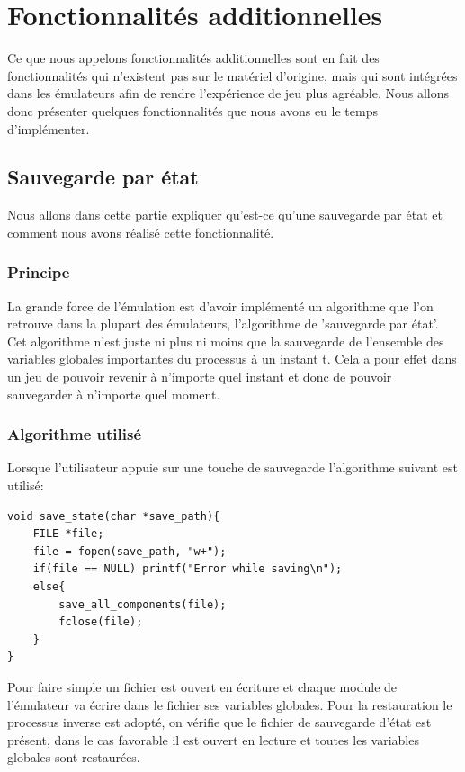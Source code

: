 \documentclass[french]{report}
\begin{document}
\section{Fonctionnalités additionnelles}
Ce que nous appelons fonctionnalités additionnelles sont en fait des fonctionnalités qui n'existent pas sur le matériel d'origine, mais qui sont intégrées dans les émulateurs afin de rendre l'expérience de jeu plus agréable. Nous allons donc présenter quelques fonctionnalités que nous avons eu le temps d'implémenter.
\subsection{Sauvegarde par état}
Nous allons dans cette partie expliquer qu'est-ce qu'une sauvegarde par état et comment nous avons réalisé cette fonctionnalité.
\subsubsection{Principe}
La grande force de l'émulation est d'avoir implémenté un algorithme que l'on retrouve dans la plupart des émulateurs, l'algorithme de 'sauvegarde par état'. Cet algorithme n'est juste ni plus ni moins que la sauvegarde de l'ensemble des variables globales importantes du processus à un instant t. Cela a pour effet dans un jeu de pouvoir revenir à n'importe quel instant et donc de pouvoir sauvegarder à n'importe quel moment.
\subsubsection{Algorithme utilisé}
Lorsque l'utilisateur appuie sur une touche de sauvegarde l'algorithme suivant est utilisé:
\begin{lstlisting}
void save_state(char *save_path){
	FILE *file;
	file = fopen(save_path, "w+");
	if(file == NULL) printf("Error while saving\n");
	else{
		save_all_components(file);
		fclose(file);
	}
}
\end{lstlisting}
Pour faire simple un fichier est ouvert en écriture et chaque module de l'émulateur va écrire dans le fichier ses variables globales.
Pour la restauration le processus inverse est adopté, on vérifie que le fichier de sauvegarde d'état est présent, dans le cas favorable il est ouvert en lecture et toutes les variables globales sont restaurées.
\end{document}
